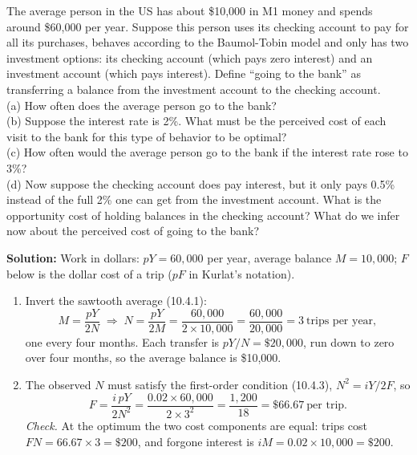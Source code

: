 \documentclass[12pt, letterpaper]{article}
\begin{document}
\begin{tcolorbox}[oddbox,title={Problem 10.5 \quad Going to the Bank}]
\begin{tcolorbox}[questionbox]
The average person in the US has about \$10,000 in M1 money and spends around \$60,000 per
year. Suppose this person uses its checking account to pay for all its purchases, behaves
according to the Baumol-Tobin model and only has two investment options: its checking account
(which pays zero interest) and an investment account (which pays interest). Define ``going to
the bank'' as transferring a balance from the investment account to the checking account.\\[3pt]
(a) How often does the average person go to the bank?\\
(b) Suppose the interest rate is 2\%. What must be the perceived cost of each visit to the bank
for this type of behavior to be optimal?\\
(c) How often would the average person go to the bank if the interest rate rose to 3\%?\\
(d) Now suppose the checking account does pay interest, but it only pays 0.5\% instead of the
full 2\% one can get from the investment account. What is the opportunity cost of holding
balances in the checking account? What do we infer now about the perceived cost of going to the
bank?
\end{tcolorbox}

\textbf{Solution:} Work in dollars: $pY=60{,}000$ per year, average balance $M=10{,}000$; $F$
below is the dollar cost of a trip ($pF$ in Kurlat's notation).

\begin{enumerate}
\item Invert the sawtooth average (10.4.1):
\[
M=\frac{pY}{2N}\;\Longrightarrow\;N=\frac{pY}{2M}=\frac{60{,}000}{2\times10{,}000}
=\frac{60{,}000}{20{,}000}=\boxed{3\ \text{trips per year}},
\]
one every four months. Each transfer is $pY/N=\$20{,}000$, run down to zero over four months,
so the average balance is \$10{,}000.

\item The observed $N$ must satisfy the first-order condition (10.4.3), $N^2=iY/2F$, so
\[
F=\frac{i\,pY}{2N^{2}}=\frac{0.02\times60{,}000}{2\times3^{2}}=\frac{1{,}200}{18}
=\boxed{\$66.67\ \text{per trip}}.
\]
\emph{Check.} At the optimum the two cost components are equal: trips cost
$FN=66.67\times3=\$200$, and forgone interest is $iM=0.02\times10{,}000=\$200$. \checkmark


\end{enumerate}
\end{tcolorbox}
\end{document}
